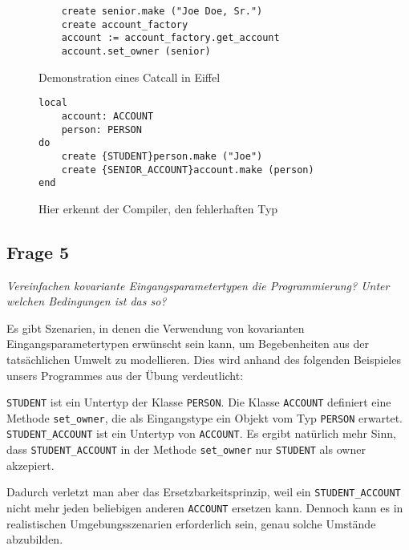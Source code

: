 \documentclass[a4paper,10pt]{article}
\begin{document}
\begin{figure}[H]
\begin{lstlisting}
    create senior.make ("Joe Doe, Sr.")
    create account_factory
    account := account_factory.get_account
    account.set_owner (senior)
\end{lstlisting}
\caption{Demonstration eines Catcall in Eiffel}
\end{figure}

\begin{figure}[H]
\begin{lstlisting}
local
    account: ACCOUNT
    person: PERSON
do
    create {STUDENT}person.make ("Joe")
    create {SENIOR_ACCOUNT}account.make (person)
end
\end{lstlisting}
\caption{Hier erkennt der Compiler, den fehlerhaften Typ}
\end{figure}

\vspace{3mm}


\subsection{Frage 5}

\emph{Vereinfachen kovariante Eingangsparametertypen die Programmierung? Unter 
welchen Bedingungen ist das so?}

\vspace{3mm}

Es gibt Szenarien, in denen die Verwendung von kovarianten Eingangsparametertypen erwünscht sein kann, um Begebenheiten aus der tatsächlichen Umwelt zu modellieren. Dies wird anhand des folgenden Beispieles unsers Programmes aus der Übung verdeutlicht:

\lstinline|STUDENT| ist ein Untertyp der Klasse \lstinline|PERSON|. Die Klasse \lstinline|ACCOUNT| definiert eine Methode \lstinline|set_owner|, die als Eingangstype ein Objekt vom Typ \lstinline|PERSON| erwartet. \lstinline|STUDENT_ACCOUNT| ist ein Untertyp von \lstinline|ACCOUNT|. Es ergibt natürlich mehr Sinn, dass \lstinline|STUDENT_ACCOUNT| in der Methode \lstinline|set_owner| nur \lstinline|STUDENT| als owner akzepiert. 

Dadurch verletzt man aber das Ersetzbarkeitsprinzip, weil ein \lstinline|STUDENT_ACCOUNT| nicht mehr jeden beliebigen anderen \lstinline|ACCOUNT| ersetzen kann. Dennoch kann es in realistischen Umgebungsszenarien erforderlich sein, genau solche Umstände abzubilden.


\begin{comment}
Von OOP: Mehrfach dynamisches Binden, Multimethoden.
\end{comment}
\end{document}
